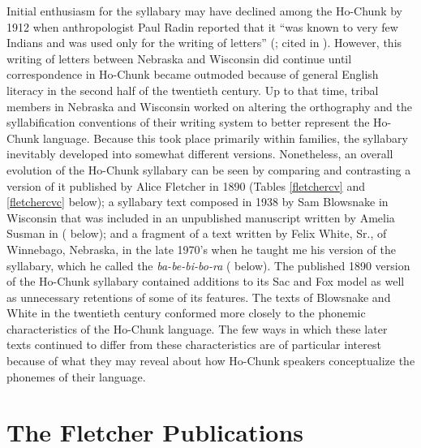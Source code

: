 \documentclass[output=paper]{LSP/langsci}
\begin{document}
Initial enthusiasm for the syllabary may have declined among the Ho-Chunk by 1912 when anthropologist Paul Radin reported that it ``was known to very few Indians and was used only for the writing of letters'' (\citealt[21]{Radin1954}; cited in \citealt[161]{Walker1981}). However, this writing of letters between Nebraska and Wisconsin did continue until correspondence in Ho-Chunk became outmoded because of general English literacy in the second half of the twentieth century. Up to that time, tribal members in Nebraska and Wisconsin worked on altering the orthography and the syllabification conventions of their writing system to better represent the Ho-Chunk language. Because this took place primarily within families, the syllabary inevitably developed into somewhat different versions. Nonetheless, an overall evolution of the Ho-Chunk syllabary can be seen by comparing and contrasting a version of it published by Alice Fletcher in 1890 (Tables \ref{fletchercv} and \ref{fletchercvc} below); a syllabary text composed in 1938 by Sam Blowsnake in Wisconsin that was included in an unpublished manuscript written by Amelia Susman in \citeyear{Susman1939} ( below); and a fragment of a text written by Felix White, Sr., of Winnebago, Nebraska, in the late 1970's when he taught me his version of the syllabary, which he called the \emph{ba-be-bi-bo-ra} ( below). The published 1890 version of the Ho-Chunk syllabary contained additions to its Sac and Fox model as well as unnecessary retentions of some of its features. The texts of Blowsnake and White in the twentieth century conformed more closely to the phonemic characteristics of the Ho-Chunk language. The few ways in which these later texts continued to differ from these characteristics are of particular interest because of what they may reveal about how Ho-Chunk speakers conceptualize the phonemes of their language.

\section{The Fletcher Publications}
\end{document}
